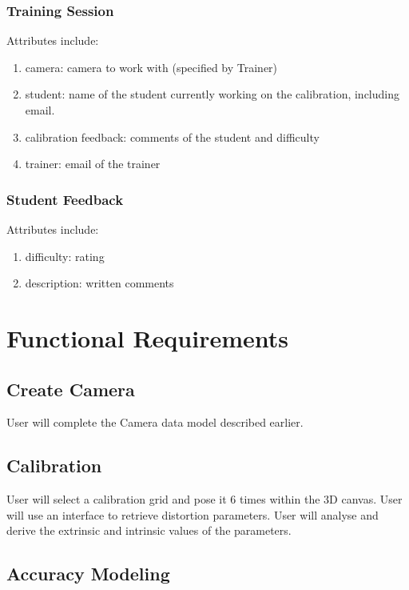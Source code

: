 \documentclass[11pt]{report}
\begin{document}
\subsubsection{Training Session}

Attributes include: 
\begin{enumerate}
\item camera: camera to work with (specified by Trainer) 
\item student: name of the student currently working on the calibration, including email.
\item calibration feedback: comments of the student and difficulty  
\item trainer: email of the trainer 
\end{enumerate}

\subsubsection{Student Feedback}

Attributes include: 
\begin{enumerate}
\item difficulty: rating 
\item description: written comments 
\end{enumerate}

\section{Functional Requirements}

\subsection{Create Camera}

User will complete the Camera data model described earlier. 

\subsection{Calibration}

User will select a calibration grid and pose it 6 times within the 3D canvas. 
User will use an  interface to retrieve distortion parameters.
User will analyse and derive the extrinsic and intrinsic values of the parameters. 

\subsection{Accuracy Modeling}
\end{document}
